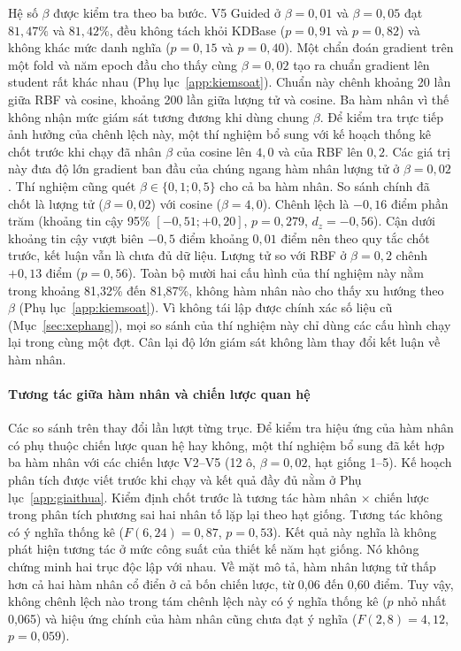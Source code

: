 Hệ số $\beta$ được kiểm tra theo ba bước. V5 Guided ở $\beta = 0{,}01$ và
$\beta = 0{,}05$ đạt $81{,}47\%$ và $81{,}42\%$, đều không tách khỏi KDBase
($p = 0{,}91$ và $p = 0{,}82$) và không khác mức danh nghĩa ($p = 0{,}15$ và
$p = 0{,}40$). Một chẩn đoán gradient trên một fold và năm epoch đầu cho thấy cùng
$\beta = 0{,}02$ tạo ra chuẩn gradient lên student rất khác nhau
(Phụ lục~\ref{app:kiemsoat}). Chuẩn này chênh khoảng 20 lần giữa RBF và
cosine, khoảng 200 lần giữa lượng tử và cosine. Ba hàm nhân vì thế không nhận mức giám sát
tương đương khi dùng chung $\beta$. Để kiểm tra trực tiếp ảnh hưởng của chênh lệch này, một thí nghiệm bổ sung
với kế hoạch thống kê chốt trước khi chạy đã nhân $\beta$ của cosine lên
$4{,}0$ và của RBF lên $0{,}2$. Các giá trị này đưa độ lớn gradient ban đầu
của chúng ngang hàm nhân lượng tử ở $\beta = 0{,}02$.
Thí nghiệm cũng quét $\beta \in \{0{,}1; 0{,}5\}$ cho cả ba hàm nhân. So
sánh chính đã chốt là lượng tử ($\beta = 0{,}02$) với cosine
($\beta = 4{,}0$). Chênh lệch là $-0{,}16$ điểm phần trăm (khoảng tin cậy
95\% $[-0{,}51; +0{,}20]$, $p = 0{,}279$, $d_z = -0{,}56$). Cận dưới khoảng
tin cậy vượt biên $-0{,}5$ điểm khoảng $0{,}01$ điểm nên theo quy tắc chốt
trước, kết luận vẫn là chưa đủ dữ liệu. Lượng tử so với RBF ở
$\beta = 0{,}2$ chênh $+0{,}13$ điểm ($p = 0{,}56$). Toàn bộ mười hai cấu
hình của thí nghiệm này nằm trong khoảng 81,32\% đến 81,87\%, không hàm nhân
nào cho thấy xu hướng theo $\beta$ (Phụ lục~\ref{app:kiemsoat}). Vì không
tái lập được chính xác số liệu cũ (Mục~\ref{sec:xephang}), mọi so sánh của
thí nghiệm này chỉ dùng các cấu hình chạy lại trong cùng một đợt. Cân lại
độ lớn giám sát không làm thay đổi kết luận về hàm nhân.

\paragraph{Tương tác giữa hàm nhân và chiến lược quan hệ}

Các so sánh trên thay đổi lần lượt từng trục. Để kiểm tra hiệu ứng của hàm nhân có phụ thuộc chiến lược quan hệ hay không,
một thí nghiệm bổ sung đã kết hợp ba hàm nhân với các chiến lược V2--V5
(12 ô, $\beta = 0{,}02$, hạt giống 1--5). Kế hoạch phân tích được viết trước
khi chạy và kết quả đầy đủ nằm ở Phụ lục~\ref{app:giaithua}. Kiểm định chốt trước là tương tác hàm nhân
$\times$ chiến lược trong phân tích phương sai hai nhân tố lặp lại theo hạt
giống. Tương tác không có ý nghĩa thống kê ($F(6, 24) = 0{,}87$,
$p = 0{,}53$). Kết quả này nghĩa là không phát hiện tương tác ở mức công
suất của thiết kế năm hạt giống. Nó không chứng minh hai trục độc lập với
nhau. Về mặt mô tả, hàm nhân lượng tử thấp hơn cả hai hàm nhân cổ điển ở cả
bốn chiến lược, từ 0,06 đến 0,60 điểm. Tuy vậy, không chênh lệch nào trong
tám chênh lệch này có ý nghĩa thống kê ($p$ nhỏ nhất 0,065) và hiệu ứng
chính của hàm nhân cũng chưa đạt ý nghĩa ($F(2, 8) = 4{,}12$,
$p = 0{,}059$).

